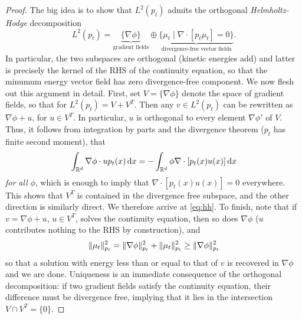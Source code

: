 \documentclass{scrartcl}
\begin{document}
\begin{proof}
    The big idea is to show that $L^2(p_t)$ admits the orthogonal \textit{Helmholtz-Hodge} decomposition 
    \begin{equation}
    L^2(p_t) = \underbrace{\{\nabla \phi\}}_{\text{gradient fields}} \oplus \underbrace{\{\mu_t \mid \nabla \cdot [p_t \mu_t] = 0\}}_{\text{divergence-free vector fields}}. \label{eq:hh}
    \end{equation}
    In particular, the two subspaces are orthogonal (kinetic energies add) and latter is precisely the kernel of the RHS of the continuity equation, so that the minumum energy vector field has zero divergence-free component. We now flesh out this argument in detail.
    First, set $V = \{\nabla \phi\}$ denote the space of gradient fields, so that for $L^2(p_t) = V + V^T$. Then any $v\in L^2(p_t)$ can be rewritten as $\nabla \phi + u$, for $u \in V^T$. In particular, $u$ is orthogonal to every element $\nabla \phi'$ of $V$. Thus, it follows from integration by parts and the divergence theorem ($p_t$ has finite second moment), that
    \begin{equation}
        \int_{\RR^d} \nabla \phi \cdot u p_t(x) \d x = - \int_{\RR^d}\phi \nabla \cdot [p_t(x)u(x)] \d x
        \label{eq:hh_orthog}
    \end{equation}
    \textit{for all} $\phi$, which is enough to imply that $\nabla \cdot [p_t(x)u(x)] = 0$ everywhere. This shows that $V^T$ is contained in the divergence free subspace, and the other direction is similarly direct. We therefore arrive at \cref{eq:hh}. 
    To finish, note that if $v = \nabla \phi + u$, $u \in V^T$, solves the continuity equation, then so does $\nabla \phi$ ($u$ contributes nothing to the RHS by construction), and 
    \begin{equation}
        \lVert\mu_t\rVert^2_{p_t} = \lVert\nabla \phi\rVert^2_{p_t} + \lVert\mu_t\rVert^2_{p_t} \ge \lVert\nabla \phi\rVert^2_{p_t}
    \end{equation}
    so that a solution with energy less than or equal to that of $v$ is recovered in $\nabla \phi$ and we are done. Uniqueness is an immediate consequence of the orthogonal decomposition: if two gradient fields satisfy the continuity equation, their difference must be divergence free, implying that it lies in the intersection $V \cap V^T = \{0\}$.
    
\end{proof}
\end{document}
